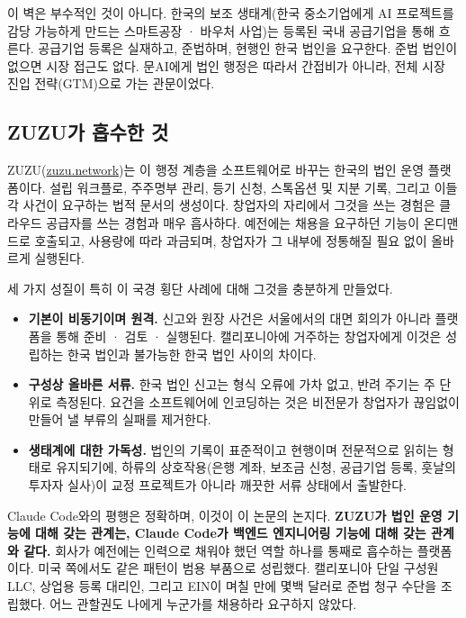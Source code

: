 \documentclass{article}
\begin{document}
이 벽은 부수적인 것이 아니다. 한국의 보조 생태계(한국 중소기업에게 AI 프로젝트를 감당 가능하게 만드는 스마트공장 · 바우처 사업)는 등록된 국내 공급기업을 통해 흐른다. 공급기업 등록은 실재하고, 준법하며, 현행인 한국 법인을 요구한다. 준법 법인이 없으면 시장 접근도 없다. 문AI에게 법인 행정은 따라서 간접비가 아니라, 전체 시장 진입 전략(GTM)으로 가는 관문이었다.

\subsection{ZUZU가 흡수한 것}

ZUZU(\href{https://zuzu.network}{zuzu.network})는 이 행정 계층을 소프트웨어로 바꾸는 한국의 법인 운영 플랫폼이다. 설립 워크플로, 주주명부 관리, 등기 신청, 스톡옵션 및 지분 기록, 그리고 이들 각 사건이 요구하는 법적 문서의 생성이다. 창업자의 자리에서 그것을 쓰는 경험은 클라우드 공급자를 쓰는 경험과 매우 흡사하다. 예전에는 채용을 요구하던 기능이 온디맨드로 호출되고, 사용량에 따라 과금되며, 창업자가 그 내부에 정통해질 필요 없이 올바르게 실행된다.

세 가지 성질이 특히 이 국경 횡단 사례에 대해 그것을 충분하게 만들었다.

\begin{itemize}
    \item \textbf{기본이 비동기이며 원격.} 신고와 원장 사건은 서울에서의 대면 회의가 아니라 플랫폼을 통해 준비 · 검토 · 실행된다. 캘리포니아에 거주하는 창업자에게 이것은 성립하는 한국 법인과 불가능한 한국 법인 사이의 차이다.
    \item \textbf{구성상 올바른 서류.} 한국 법인 신고는 형식 오류에 가차 없고, 반려 주기는 주 단위로 측정된다. 요건을 소프트웨어에 인코딩하는 것은 비전문가 창업자가 끊임없이 만들어 낼 부류의 실패를 제거한다.
    \item \textbf{생태계에 대한 가독성.} 법인의 기록이 표준적이고 현행이며 전문적으로 읽히는 형태로 유지되기에, 하류의 상호작용(은행 계좌, 보조금 신청, 공급기업 등록, 훗날의 투자자 실사)이 교정 프로젝트가 아니라 깨끗한 서류 상태에서 출발한다.
\end{itemize}

Claude Code와의 평행은 정확하며, 이것이 이 논문의 논지다. \textbf{ZUZU가 법인 운영 기능에 대해 갖는 관계는, Claude Code가 백엔드 엔지니어링 기능에 대해 갖는 관계와 같다.} 회사가 예전에는 인력으로 채워야 했던 역할 하나를 통째로 흡수하는 플랫폼이다. 미국 쪽에서도 같은 패턴이 범용 부품으로 성립했다. 캘리포니아 단일 구성원 LLC, 상업용 등록 대리인, 그리고 EIN이 며칠 만에 몇백 달러로 준법 청구 수단을 조립했다. 어느 관할권도 나에게 누군가를 채용하라 요구하지 않았다.
\end{document}

